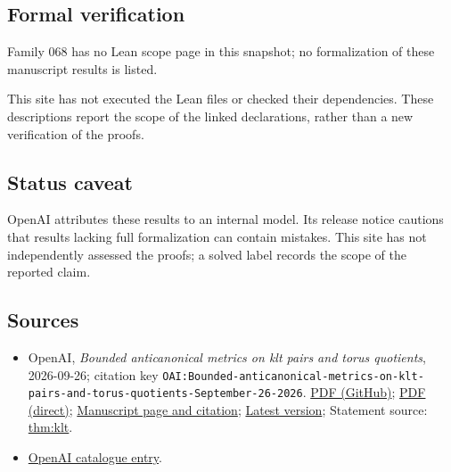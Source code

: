 \documentclass[11pt]{article}
\begin{document}
\subsection{Formal verification}
Family 068 has no Lean scope page in this snapshot; no formalization of these manuscript results is listed.

This site has not executed the Lean files or checked their dependencies. These descriptions report the scope of the linked declarations, rather than a new verification of the proofs.

\subsection{Status caveat}
OpenAI attributes these results to an internal model. Its release notice cautions that results lacking full formalization can contain mistakes. This site has not independently assessed the proofs; a solved label records the scope of the reported claim.

\subsection{Sources}
\begin{itemize}
\item OpenAI, \emph{Bounded anticanonical metrics on klt pairs and torus quotients}, 2026-09-26; citation key \texttt{OAI:Bounded-anticanonical-metrics-on-klt-pairs-and-torus-quotients-September-26-2026}. \href{https://github.com/openai/math/blob/adc7f1241b42e322a6451854ab7e4b4c146bf78a/preprints/Bounded-anticanonical-metrics-on-klt-pairs-and-torus-quotients-September-26-2026/main.pdf}{PDF (GitHub)}; \href{https://github.com/openai/math/raw/adc7f1241b42e322a6451854ab7e4b4c146bf78a/preprints/Bounded-anticanonical-metrics-on-klt-pairs-and-torus-quotients-September-26-2026/main.pdf}{PDF (direct)}; \href{https://github.com/openai/math/blob/adc7f1241b42e322a6451854ab7e4b4c146bf78a/preprints/Bounded-anticanonical-metrics-on-klt-pairs-and-torus-quotients-September-26-2026/README.md}{Manuscript page and citation}; \href{https://github.com/openai/math/blob/main/preprints/Bounded-anticanonical-metrics-on-klt-pairs-and-torus-quotients-September-26-2026/main.pdf}{Latest version}; Statement source: \href{https://github.com/openai/math/blob/adc7f1241b42e322a6451854ab7e4b4c146bf78a/preprints/Bounded-anticanonical-metrics-on-klt-pairs-and-torus-quotients-September-26-2026/build/source/sections/introduction.tex\#L15}{thm:klt}.
\item \href{https://github.com/openai/math/blob/adc7f1241b42e322a6451854ab7e4b4c146bf78a/CONTENTS.md}{OpenAI catalogue entry}.
\end{itemize}
\end{document}
